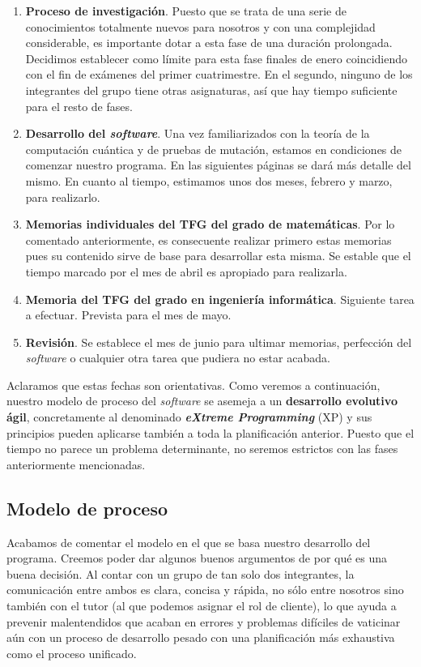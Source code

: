 \begin{enumerate}
\item \textbf{Proceso de investigación}. Puesto que se trata de una serie de conocimientos totalmente nuevos para nosotros y con una complejidad considerable, es importante dotar a esta fase de una duración prolongada. Decidimos establecer como límite para esta fase finales de enero coincidiendo con el fin de exámenes del primer cuatrimestre. En el segundo, ninguno de los integrantes del grupo tiene otras asignaturas, así que hay tiempo suficiente para el resto de fases.
\item \textbf{Desarrollo del \textit{software}}. Una vez familiarizados con la teoría de la computación cuántica y de pruebas de mutación, estamos en condiciones de comenzar nuestro programa. En las siguientes páginas se dará más detalle del mismo. En cuanto al tiempo, estimamos unos dos meses, febrero y marzo, para realizarlo.
\item \textbf{Memorias individuales del TFG del grado de matemáticas}. Por lo comentado anteriormente, es consecuente realizar primero estas memorias pues su contenido sirve de base para desarrollar esta misma. Se estable que el tiempo marcado por el mes de abril es apropiado para realizarla.
\item \textbf{Memoria del TFG del grado en ingeniería informática}. Siguiente tarea a efectuar. Prevista para el mes de mayo.
\item \textbf{Revisión}. Se establece el mes de junio para ultimar memorias, perfección del \textit{software} o cualquier otra tarea que pudiera no estar acabada.
\end{enumerate}

Aclaramos que estas fechas son orientativas. Como veremos a continuación, nuestro modelo de proceso del \textit{software} se asemeja a un \textbf{desarrollo evolutivo ágil}, concretamente al denominado \textbf{\textit{eXtreme Programming}} (XP) y sus principios pueden aplicarse también a toda la planificación anterior. Puesto que el tiempo no parece un problema determinante, no seremos estrictos con las fases anteriormente mencionadas.

\subsection{Modelo de proceso}

Acabamos de comentar el modelo en el que se basa nuestro desarrollo del programa. Creemos poder dar algunos buenos argumentos de por qué es una buena decisión. Al contar con un grupo de tan solo dos integrantes, la comunicación entre ambos es clara, concisa y rápida, no sólo entre nosotros sino también con el tutor (al que podemos asignar el rol de cliente), lo que ayuda a prevenir malentendidos que acaban en errores y problemas difíciles de vaticinar aún con un proceso de desarrollo pesado con una planificación más exhaustiva como el proceso unificado.

